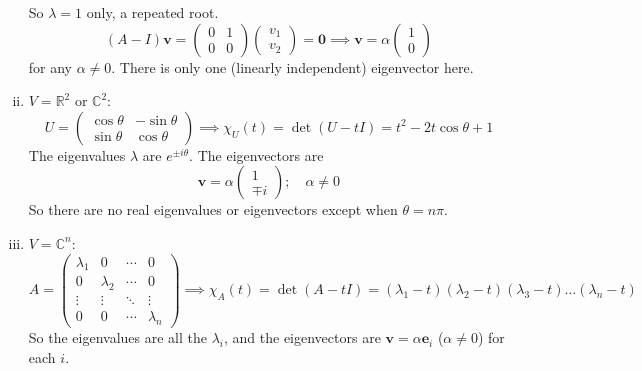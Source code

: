 \documentclass{article}
\begin{document}
\begin{enumerate}[(i)]
	      So $\lambda = 1$ only, a repeated root.
	      \[ (A - I)\bm v = \begin{pmatrix}
			      0 & 1 \\ 0 & 0
		      \end{pmatrix}\begin{pmatrix}
			      v_1 \\ v_2
		      \end{pmatrix} = \bm 0 \implies \bm v = \alpha\begin{pmatrix}
			      1 \\ 0
		      \end{pmatrix} \]
	      for any $\alpha \neq 0$. There is only one (linearly independent) eigenvector here.
	\item $V = \mathbb R^2$ or $\mathbb C^2$:
	      \[ U = \begin{pmatrix}
			      \cos\theta & -\sin\theta \\ \sin\theta & \cos\theta
		      \end{pmatrix} \implies \chi_U(t) = \det(U - tI) = t^2 - 2t\cos\theta + 1 \]
	      The eigenvalues $\lambda$ are $e^{\pm i \theta}$. The eigenvectors are
	      \[ \bm v = \alpha \begin{pmatrix}
			      1 \\ \mp i
		      \end{pmatrix};\quad \alpha \neq 0 \]
	      So there are no real eigenvalues or eigenvectors except when $\theta = n \pi$.
	\item $V = \mathbb C^n$:
	      \[ A = \begin{pmatrix}
			      \lambda_1 & 0         & \cdots & 0         \\
			      0         & \lambda_2 & \cdots & 0         \\
			      \vdots    & \vdots    & \ddots & \vdots    \\
			      0         & 0         & \cdots & \lambda_n
		      \end{pmatrix} \implies \chi_A(t) = \det(A - tI) = (\lambda_1 - t)(\lambda_2 - t)(\lambda_3 - t)\dots(\lambda_n - t) \]
	      So the eigenvalues are all the $\lambda_i$, and the eigenvectors are $\bm v = \alpha \bm e_i$ ($\alpha \neq 0$) for each $i$.
\end{enumerate}
\end{document}
